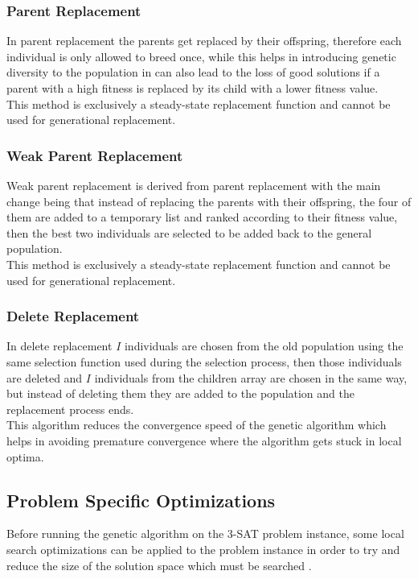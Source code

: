	\subsubsection{Parent Replacement}

	In parent replacement the parents get replaced by their offspring, therefore each individual is only allowed to breed once, while this helps in introducing genetic diversity to the population in can also lead to the loss of good solutions if a parent with a high fitness is replaced by its child with a lower fitness value.
	\\This method is exclusively a steady-state replacement function and cannot be used for generational replacement.

	\subsubsection{Weak Parent Replacement}

	Weak parent replacement is derived from parent replacement with the main change being that instead of replacing the parents with their offspring, the four of them are added to a temporary list and ranked according to their fitness value, then the best two individuals are selected to be added back to the general population.
	\\This method is exclusively a steady-state replacement function and cannot be used for generational replacement.

	\subsubsection{Delete Replacement}

	In delete replacement $I$ individuals are chosen from the old population using the same selection function used during the selection process, then those individuals are deleted and $I$ individuals from the children array are chosen in the same way, but instead of deleting them they are added to the population and the replacement process ends.
	\\This algorithm reduces the convergence speed of the genetic algorithm which helps in avoiding premature convergence where the algorithm gets stuck in local optima. 


\subsection{Problem Specific Optimizations}
Before running the genetic algorithm on the 3-SAT problem instance, some local search optimizations can be applied to the problem instance in order to try and reduce the size of the solution space which must be searched \parencite{Bhattacharjee2017}.

